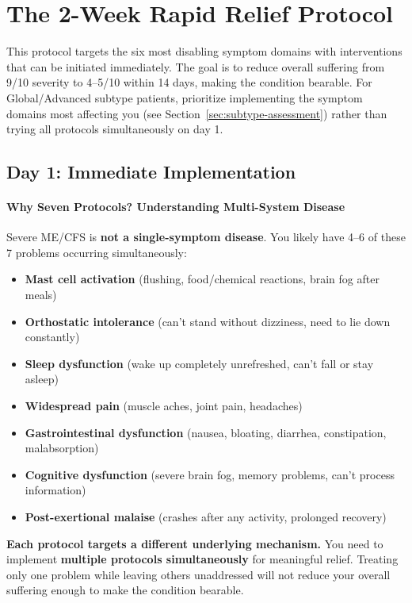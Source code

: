 \section{The 2-Week Rapid Relief Protocol}
\label{sec:two-week-protocol}

This protocol targets the six most disabling symptom domains with interventions that can be initiated immediately. The goal is to reduce overall suffering from 9/10 severity to 4--5/10 within 14 days, making the condition bearable. For Global/Advanced subtype patients, prioritize implementing the symptom domains most affecting you (see Section~\ref{sec:subtype-assessment}) rather than trying all protocols simultaneously on day 1.

\subsection{Day 1: Immediate Implementation}
\label{sec:day-one}

\paragraph{Why Seven Protocols? Understanding Multi-System Disease}

Severe ME/CFS is \textbf{not a single-symptom disease}. You likely have 4--6 of these 7 problems occurring simultaneously:

\begin{itemize}
    \item \textbf{Mast cell activation} (flushing, food/chemical reactions, brain fog after meals)
    \item \textbf{Orthostatic intolerance} (can't stand without dizziness, need to lie down constantly)
    \item \textbf{Sleep dysfunction} (wake up completely unrefreshed, can't fall or stay asleep)
    \item \textbf{Widespread pain} (muscle aches, joint pain, headaches)
    \item \textbf{Gastrointestinal dysfunction} (nausea, bloating, diarrhea, constipation, malabsorption)
    \item \textbf{Cognitive dysfunction} (severe brain fog, memory problems, can't process information)
    \item \textbf{Post-exertional malaise} (crashes after any activity, prolonged recovery)
\end{itemize}

\textbf{Each protocol targets a different underlying mechanism.} You need to implement \textbf{multiple protocols simultaneously} for meaningful relief. Treating only one problem while leaving others unaddressed will not reduce your overall suffering enough to make the condition bearable.

